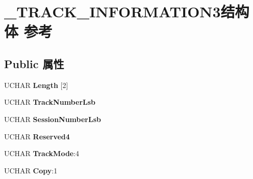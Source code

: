 \hypertarget{struct___t_r_a_c_k___i_n_f_o_r_m_a_t_i_o_n3}{}\section{\+\_\+\+T\+R\+A\+C\+K\+\_\+\+I\+N\+F\+O\+R\+M\+A\+T\+I\+O\+N3结构体 参考}
\label{struct___t_r_a_c_k___i_n_f_o_r_m_a_t_i_o_n3}
\subsection*{Public 属性}
\begin{DoxyCompactItemize}
\item 
\mbox{\label{struct___t_r_a_c_k___i_n_f_o_r_m_a_t_i_o_n3_a1d61c33b67caa1ba6dd793881b34a44a}} 
U\+C\+H\+AR {\bfseries Length} \mbox{[}2\mbox{]}
\item 
\mbox{\label{struct___t_r_a_c_k___i_n_f_o_r_m_a_t_i_o_n3_a33799d796ea82cea137fc35a6f0b6db7}} 
U\+C\+H\+AR {\bfseries Track\+Number\+Lsb}
\item 
\mbox{\label{struct___t_r_a_c_k___i_n_f_o_r_m_a_t_i_o_n3_a2297948b68baa5238f6fc975c24ca613}} 
U\+C\+H\+AR {\bfseries Session\+Number\+Lsb}
\item 
\mbox{\label{struct___t_r_a_c_k___i_n_f_o_r_m_a_t_i_o_n3_abc819dceb2c9ad8518fe764b6fcc83e7}} 
U\+C\+H\+AR {\bfseries Reserved4}
\item 
\mbox{\label{struct___t_r_a_c_k___i_n_f_o_r_m_a_t_i_o_n3_acc7529e5374f1c45f806029dcc308e47}} 
U\+C\+H\+AR {\bfseries Track\+Mode}\+:4
\item 
\mbox{\label{struct___t_r_a_c_k___i_n_f_o_r_m_a_t_i_o_n3_a4c4d203131f0b74c076f6f4112c548ac}} 
U\+C\+H\+AR {\bfseries Copy}\+:1
\item 
\mbox{\label{struct___t_r_a_c_k___i_n_f_o_r_m_a_t_i_o_n3_a046c9049ca22900dab680160efde4d4a}} 

\end{DoxyCompactItemize}
